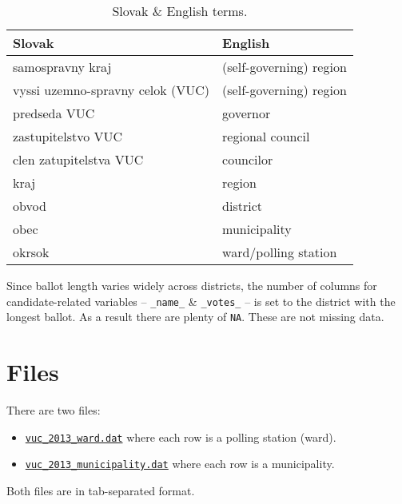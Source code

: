 \documentclass[11pt, a4paper]{article}
\begin{document}
\begin{table}[H]\footnotesize
	\label{tab:trans}
	\caption{Slovak \& English terms.}
	\begin{center}
		\begin{tabular}{ll}
			\toprule
			Slovak & English \\
			\midrule
			samospravny kraj &	(self-governing) region \\
			vyssi uzemno-spravny celok (VUC) & (self-governing) region \\
			predseda VUC & governor \\
			zastupitelstvo VUC & regional council \\
			clen zatupitelstva VUC & councilor \\
			kraj	&	region \\
		 	obvod	&	district \\
			obec 	&	municipality	\\
			okrsok	&	ward/polling station \\
			\bottomrule
		\end{tabular}
	\end{center}
\end{table}


Since ballot length varies widely across districts, the number of columns for candidate-related
variables -- \texttt{\_name\_} \& \texttt{\_votes\_} -- is set to the district with the longest ballot.
As a result there are plenty of \texttt{NA}. These are not missing data.








\section{Files}

There are two files:
\begin{itemize}
	\item	\href{https://github.com/jmedzihorsky/vuc_2013/blob/master/data/vuc_2013_ward.dat}{\texttt{vuc\_2013\_ward.dat}} where each row is a polling station (ward).
	\item	\href{https://github.com/jmedzihorsky/vuc_2013/blob/master/data/vuc_2013_municipality.dat}{\texttt{vuc\_2013\_municipality.dat}} where each row is a municipality.		
\end{itemize}
Both files are in tab-separated format.
\end{document}
